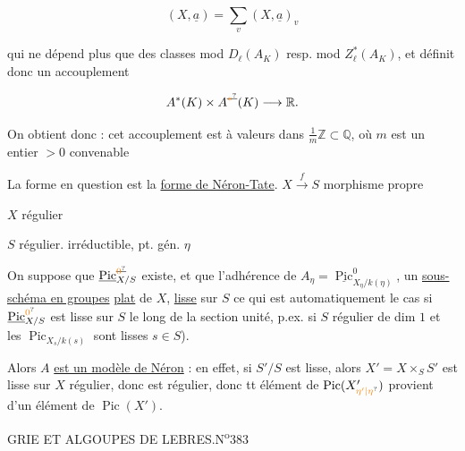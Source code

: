 \[
 (X,\underline a)=\sum_v(X,\underline a)_v
\]

qui ne dépend plus que des classes 
mod $D_\ell(A_K)$ resp. mod $Z_\ell^*(A_K)$, et définit
donc un accouplement

\[
 A^*(K)\times A^{\deleted{\unsure{*}}}(K)\longrightarrow\mathbb R .
\]

On obtient donc : cet accouplement est
à valeurs dans $\frac1m\mathbb Z\subset\mathbb Q$, où
$m$ est un entier $>0$ convenable

La forme en question est la \uline{forme de
Néron-Tate}. 
$X\xrightarrow{f}S$ morphisme  propre

$X$ régulier

$S$ régulier. irréductible, pt. gén. $\eta$

On suppose que $\underline{\operatorname{Pic}}_{X/S}^{\deleted{\unsure{0}}}$ existe, et 
 que l’adhérence  de $A_\eta=\underline{\operatorname{Pic}}_{X_\eta/k(\eta)}^{0}$,  un
\uline{sous-schéma en groupes} \uline{plat} de $X$, 
\uline{lisse} sur $S$  ce qui est automatiquement
le cas si $\underline{\operatorname{Pic}}^{\unsure{0}}_{X/S}$ est lisse sur $S$ le long de
la section unité, p.ex. si $S$ régulier de dim $1$
et les $\operatorname{Pic}_{X_s/k(s)}$ sont lisses $s\in S$).

Alors  $A$ \uline{est un modèle de Néron} :
en effet, si $S'/S$ est lisse, alors
$X'=X\times_S S'$ est lisse sur $X$ régulier, donc est
régulier, donc tt  élément de $\operatorname{Pic}(X'_{\unsure{\eta'|\eta}})$
provient d’un élément de $\operatorname{Pic}(X')$.

\hfill{}


\begin{center}GRIE ET ALGOUPES DE LEBRES.\hfill N\textsuperscript{o}383\end{center}

